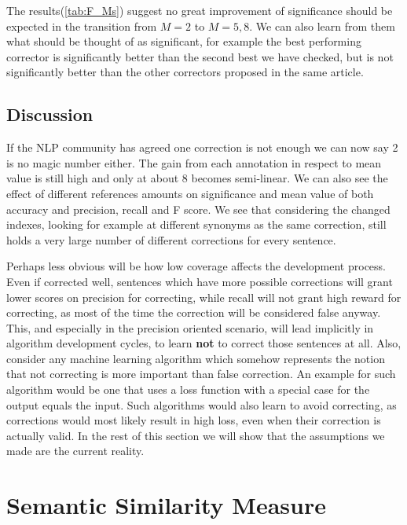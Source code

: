 \documentclass[english]{article}
\begin{document}
The results(\ref{tab:F_Ms}) suggest no great improvement of significance should be expected in the transition from $M=2$ to $M=5,8$. We can also learn from them what should be thought of as significant, for example the best performing corrector is significantly better than the second best we have checked, but is not significantly better than the other correctors proposed in the same article\cite{rozovskaya2016grammatical}.

\subsection{Discussion}

If the NLP community has agreed one correction is not enough\cite{tetreault2008native}
we can now say 2 is no magic number either. The gain from each annotation in respect to mean value is still high and only at about 8 becomes semi-linear. We can also see the effect of different references amounts on significance and mean value of both accuracy and precision, recall and F score.
We see that considering the changed indexes, looking for example at different synonyms as the same correction, still holds a very large number of different corrections for every sentence.

Perhaps less obvious will be how low coverage affects the development
process. Even if corrected well, sentences which have more possible
corrections will grant lower scores on precision for correcting, while recall will not grant high reward for correcting, as most of the time the correction will be considered false anyway. This, and especially in the precision oriented scenario, will lead implicitly in algorithm development cycles, to learn \textbf{not} to correct those sentences at all. Also, consider any machine learning algorithm which somehow represents the notion that not correcting is more important than false correction. An example for such algorithm would be one that uses a loss function with a special case for the output equals the input. Such algorithms would also learn to avoid correcting, as corrections would most likely result in high loss, even when their correction is actually valid.
In the rest of this section we will show that the assumptions we made are the current reality. 


\section{Semantic Similarity Measure}\label{sec:Semantics}
\end{document}
